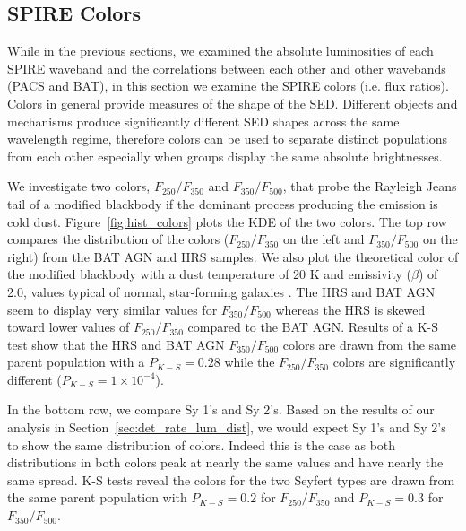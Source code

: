 \subsection{SPIRE Colors}
While in the previous sections, we examined the absolute luminosities of each SPIRE waveband and the correlations between each other and other wavebands (PACS and BAT), in this section we examine the SPIRE colors (i.e. flux ratios). Colors in general provide measures of the shape of the SED. Different objects and mechanisms produce significantly different SED shapes across the same wavelength regime, therefore colors can be used to separate distinct populations from each other especially when groups display the same absolute brightnesses.

We investigate two colors, $F_{250}/F_{350}$ and $F_{350}/F_{500}$, that probe the Rayleigh Jeans tail of a modified blackbody if the dominant process producing the emission is cold dust. Figure~\ref{fig:hist_colors} plots the KDE of the two colors. The top row compares the distribution of the colors ($F_{250}/F_{350}$ on the left and $F_{350}/F_{500}$ on the right) from the BAT AGN and HRS samples. We also plot the theoretical color of the modified blackbody with a dust temperature of 20 K and emissivity ($\beta$) of 2.0, values typical of normal, star-forming galaxies \citep[e.g.][]{Calzetti:2000fk, Smith:2012fj, Galametz:2012uq, Dale:2012dq, Cortese:2014qq}. The HRS and BAT AGN seem to display very similar values for $F_{350}/F_{500}$ whereas the HRS is skewed toward lower values of $F_{250}/F_{350}$ compared to the BAT AGN. Results of a K-S test show that the HRS and BAT AGN $F_{350}/F_{500}$ colors are drawn from the same parent population with a $P_{K-S} = 0.28$ while the $F_{250}/F_{350}$ colors are significantly different ($P_{K-S} = 1 \times 10^{-4}$). 

In the bottom row, we compare Sy 1's and Sy 2's. Based on the results of our analysis in Section~\ref{sec:det_rate_lum_dist}, we would expect Sy 1's and Sy 2's to show the same distribution of colors. Indeed this is the case as both distributions in both colors peak at nearly the same values and have nearly the same spread. K-S tests reveal the colors for the two Seyfert types are drawn from the same parent population with $P_{K-S} = 0.2$ for $F_{250}/F_{350}$ and $P_{K-S} = 0.3$ for $F_{350}/F_{500}$.
  
  